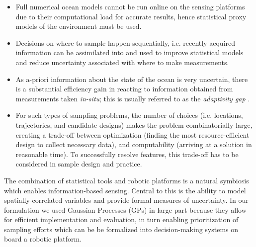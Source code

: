 \documentclass[aoas]{imsart}
\begin{document}
\begin{itemize}
\item Full numerical ocean models cannot be run online on the sensing
  platforms due to their computational load for accurate results,
  hence statistical proxy models of the environment must be used.
\item Decisions on where to sample happen sequentially, i.e.  recently
  acquired information can be assimilated into and used to improve
  statistical models and reduce uncertainty associated with where to
  make measurements.
\item As a-priori information about the state of the ocean is very
  uncertain, there is a substantial efficiency gain in reacting to
  information obtained from measurements taken \emph{in-situ}; this is
  usually referred to as the \emph{adaptivity gap}
  \citep{Krause2008phd}.
\item For such types of sampling problems, the number of choices (i.e.
  locations, trajectories, and candidate designs) makes the problem
  combinatorially large, creating a trade-off between optimization
  (finding the most resource-efficient design to collect necessary
  data), and computability (arriving at a solution in reasonable
  time). To successfully resolve features, this trade-off has to be
  considered in sample design and practice.
\end{itemize}

The combination of statistical tools and robotic platforms is a
natural symbiosis which enables information-based sensing. Central to
this is the ability to model spatially-correlated variables and
provide formal measures of uncertainty. In our formulation we used
Gaussian Processes (GPs) in large part because they allow for
efficient implementation and evaluation, in turn enabling
prioritization of sampling efforts which can be be formalized into
decision-making systems on board a robotic platform.


\end{document}
